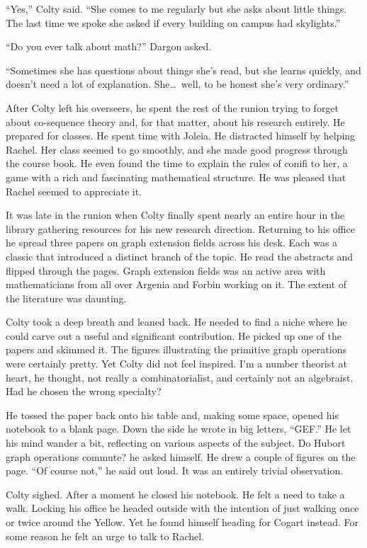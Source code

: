 ``Yes,'' Colty said. ``She comes to me regularly but she asks about little things. The last time
we spoke she asked if every building on campus had skylights.''

``Do you ever talk about math?'' Dargon asked.

``Sometimes she has questions about things she's read, but she learns quickly, and doesn't need
a lot of explanation. She\ldots\ well, to be honest she's very ordinary.''

After Colty left his overseers, he spent the rest of the runion trying to forget about
co-sequence theory and, for that matter, about his research entirely. He prepared for classes.
He spent time with Joleia. He distracted himself by helping Rachel. Her class seemed to go
smoothly, and she made good progress through the course book. He even found the time to explain
the rules of conifi to her, a game with a rich and fascinating mathematical structure. He was
pleased that Rachel seemed to appreciate it.

It was late in the runion when Colty finally spent nearly an entire hour in the library
gathering resources for his new research direction. Returning to his office he spread three
papers on graph extension fields across his desk. Each was a classic that introduced a distinct
branch of the topic. He read the abstracts and flipped through the pages. Graph extension fields
was an active area with mathematicians from all over Argenia and Forbin working on it. The
extent of the literature was daunting.

Colty took a deep breath and leaned back. He needed to find a niche where he could carve out a
useful and significant contribution. He picked up one of the papers and skimmed it. The figures
illustrating the primitive graph operations were certainly pretty. Yet Colty did not feel
inspired. I'm a number theorist at heart, he thought, not really a combinatorialist, and
certainly not an algebraist. Had he chosen the wrong specialty?

He tossed the paper back onto his table and, making some space, opened his notebook to a blank
page. Down the side he wrote in big letters, ``GEF.'' He let his mind wander a bit, reflecting
on various aspects of the subject. Do Hubort graph operations commute? he asked himself. He drew
a couple of figures on the page. ``Of course not,'' he said out loud. It was an entirely trivial
observation.

Colty sighed. After a moment he closed his notebook. He felt a need to take a walk. Locking his
office he headed outside with the intention of just walking once or twice around the Yellow. Yet
he found himself heading for Cogart instead. For some reason he felt an urge to talk to Rachel.

